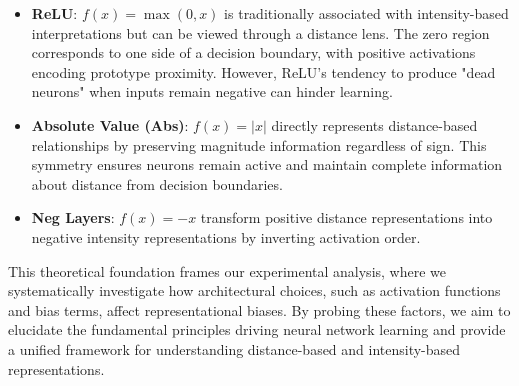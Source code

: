 \begin{itemize}
    \item \textbf{ReLU}: $f(x) = \max(0, x)$ is traditionally associated with intensity-based interpretations but can be viewed through a distance lens. The zero region corresponds to one side of a decision boundary, with positive activations encoding prototype proximity. However, ReLU's tendency to produce "dead neurons" when inputs remain negative can hinder learning.
    
    \item \textbf{Absolute Value (Abs)}: $f(x) = |x|$ directly represents distance-based relationships by preserving magnitude information regardless of sign. This symmetry ensures neurons remain active and maintain complete information about distance from decision boundaries.
    
    \item \textbf{Neg Layers}: $f(x) = -x$ transform positive distance representations into negative intensity representations by inverting activation order.
\end{itemize}

This theoretical foundation frames our experimental analysis, where we systematically investigate how architectural choices, such as activation functions and bias terms, affect representational biases. By probing these factors, we aim to elucidate the fundamental principles driving neural network learning and provide a unified framework for understanding distance-based and intensity-based representations.
